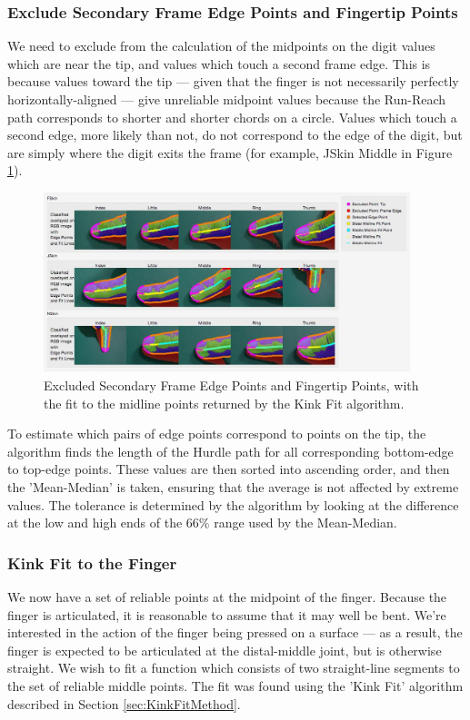 \subsubsection{Exclude Secondary Frame Edge Points and Fingertip Points }\label{sec:ExcludeSecondaryFrameEdgePointsAndFingertipPoints}
We need to exclude from the calculation of the midpoints on the digit values which are near the tip, and values which touch a second frame edge. This is because values toward the tip --- given that the finger is not necessarily perfectly horizontally-aligned --- give unreliable midpoint values because the Run-Reach path corresponds to shorter and shorter chords on a circle. Values which touch a second edge, more likely than not, do not correspond to the edge of the digit, but are simply where the digit exits the frame (for example, JSkin Middle in Figure \ref{fig:ExcludedEdgePointsAndMidlineFit}).

\begin{figure}[h!]
  \centering
    \includegraphics[width=0.95\textwidth]{Chapter4/Figs/ExcludedEdgePointsAndMidlineFit.jpg}
    \caption{Excluded Secondary Frame Edge Points and Fingertip Points, with the fit to the midline points returned by the Kink Fit algorithm.}\label{fig:ExcludedEdgePointsAndMidlineFit}
\end{figure}

To estimate which pairs of edge points correspond to points on the tip, the algorithm finds the length of the Hurdle path for all corresponding bottom-edge to top-edge points. These values are then sorted into ascending order, and then the 'Mean-Median' is taken, ensuring that the average is not affected by extreme values. The tolerance is determined by the algorithm by looking at the difference at the low and high ends of the $66\%$ range used by the Mean-Median.

\subsubsection{Kink Fit to the Finger}\label{sec:KinkFitToTheFinger}
We now have a set of reliable points at the midpoint of the finger. Because the finger is articulated, it is reasonable to assume that it may well be bent. We're interested in the action of the finger being pressed on a surface --- as a result, the finger is expected to be articulated at the distal-middle joint, but is otherwise straight. We wish to fit a function which consists of two straight-line segments to the set of reliable middle points. The fit was found using the 'Kink Fit' algorithm described in Section \ref{sec:KinkFitMethod}.

